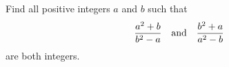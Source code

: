 Find all positive integers $a$ and $b$ such that \[ {a^2+b\over b^2-a}\quad\text{and}\quad{b^2+a\over a^2-b} \] are both integers.